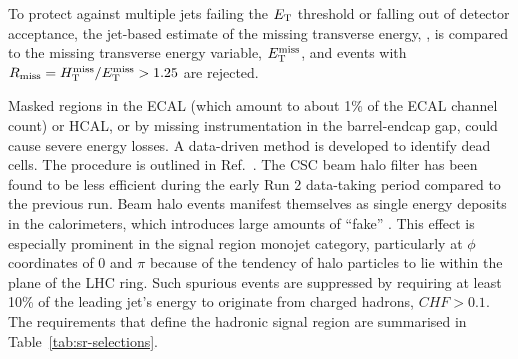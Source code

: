 To protect against multiple jets failing the ${E_{\text T}}$ threshold or falling out of detector acceptance, the jet-based
estimate of the missing transverse energy, \mht, is compared to the missing transverse energy variable, $\mbox{$E_\text{T}^{\rm miss}$}$, and events with $R_{\rm
  miss}=\mbox{$H_{\rm T}^{\rm miss}$}/\mbox{$E_\text{T}^{\rm miss}$} > 1.25$ are rejected. 
  
Masked regions in the ECAL (which amount to about 1\% of the ECAL channel count)
or HCAL, or by missing instrumentation in the barrel-endcap gap, could cause 
severe energy losses. A data-driven method is developed to identify dead cells. The procedure is outlined in 
Ref.~\cite{alphaTnote}.
The CSC beam halo filter has been found to be less efficient during the early Run 2 data-taking period compared to the previous run.
Beam halo events manifest themselves as single energy deposits in the calorimeters, which introduces large amounts of ``fake'' \met. This effect is especially prominent in the signal region monojet category, particularly at $\phi$ coordinates of 0 and $\pi$ because of the tendency of halo particles to lie within the plane of the LHC ring.  Such spurious events are suppressed by requiring at least 10\% of the leading jet's energy to originate from charged hadrons, $CHF>0.1$.  The requirements that define the hadronic signal region are summarised in Table~\ref{tab:sr-selections}.

